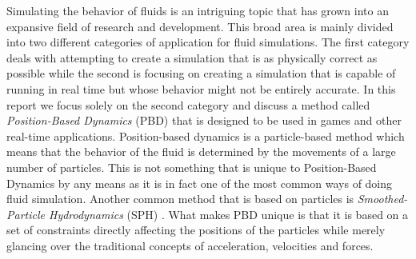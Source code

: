 Simulating the behavior of fluids is an intriguing topic that has grown into an
expansive field of research and development. This broad area is mainly divided
into two different categories of application for fluid simulations. The first
category deals with attempting to create a simulation that is as physically
correct as possible while the second is focusing on creating a simulation that
is capable of running in real time but whose behavior might not be entirely
accurate. In this report we focus solely on the second category and discuss a
method called \textit{Position-Based Dynamics} (PBD) \cite{muller2007position}
that is designed to be used in games and other real-time applications.
Position-based dynamics is a particle-based method which means that the
behavior of the fluid is determined by the movements of a large number of
particles. This is not something that is unique to Position-Based Dynamics by
any means as it is in fact one of the most common ways of doing fluid
simulation. Another common method that is based on particles is
\textit{Smoothed-Particle Hydrodynamics} (SPH) \cite{monaghan1992smoothed}.
What makes PBD unique is that it is based on a set of constraints directly
affecting the positions of the particles while merely glancing over the
traditional concepts of acceleration, velocities and forces.
